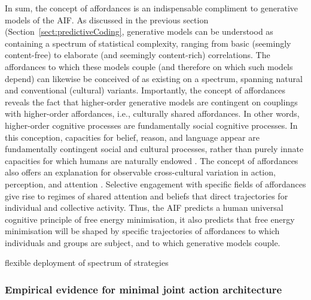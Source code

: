 \begin{CJK}{UTF8}{gbsn}
In sum, the concept of affordances is an indispensable compliment to generative models of the AIF.  As discussed in the previous section (Section~\ref{sect:predictiveCoding}, generative models can be understood as containing a spectrum of statistical complexity, ranging from basic (seemingly content-free) to elaborate (and seemingly content-rich) correlations.  The affordances to which these models couple (and therefore on which such models depend) can likewise be conceived of as existing on a spectrum, spanning natural and conventional (cultural) variants.  Importantly, the concept of affordances reveals the fact that higher-order generative models are contingent on couplings with higher-order affordances, i.e., culturally shared affordances.  In other words, higher-order cognitive processes are fundamentally social cognitive processes. In this conception, capacities for belief, reason, and language appear are fundamentally contingent social and cultural processes, rather than purely innate capacities for which humans are naturally endowed  \citep{Sperber1997,Henrich2015}.  The concept of affordances also offers an explanation for observable cross-cultural variation in action, perception, and attention \citep[see][]{Nisbett2003}.  Selective engagement with specific fields of affordances give rise to regimes of shared attention and beliefs that direct trajectories for individual and collective activity.  Thus, the AIF predicts a human universal cognitive principle of free energy minimisation, it also predicts that free energy minimisation will be shaped by specific trajectories of affordances to which individuals and groups are subject, and to which generative models couple.






  flexible deployment of spectrum of strategies




\subsubsection{Empirical evidence for minimal joint action architecture}




\end{CJK}
